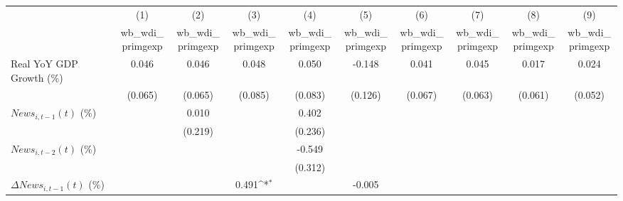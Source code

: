 {
\def\sym#1{\ifmmode^{#1}\else\(^{#1}\)\fi}
\begin{tabular}{l*{9}{c}}
\toprule
                    &\multicolumn{1}{c}{(1)}&\multicolumn{1}{c}{(2)}&\multicolumn{1}{c}{(3)}&\multicolumn{1}{c}{(4)}&\multicolumn{1}{c}{(5)}&\multicolumn{1}{c}{(6)}&\multicolumn{1}{c}{(7)}&\multicolumn{1}{c}{(8)}&\multicolumn{1}{c}{(9)}\\
                    &\multicolumn{1}{c}{wb_wdi_primgexp}&\multicolumn{1}{c}{wb_wdi_primgexp}&\multicolumn{1}{c}{wb_wdi_primgexp}&\multicolumn{1}{c}{wb_wdi_primgexp}&\multicolumn{1}{c}{wb_wdi_primgexp}&\multicolumn{1}{c}{wb_wdi_primgexp}&\multicolumn{1}{c}{wb_wdi_primgexp}&\multicolumn{1}{c}{wb_wdi_primgexp}&\multicolumn{1}{c}{wb_wdi_primgexp}\\
\midrule
Real YoY GDP Growth (\%)&       0.046         &       0.046         &       0.048         &       0.050         &      -0.148         &       0.041         &       0.045         &       0.017         &       0.024         \\
                    &     (0.065)         &     (0.065)         &     (0.085)         &     (0.083)         &     (0.126)         &     (0.067)         &     (0.063)         &     (0.061)         &     (0.052)         \\
\addlinespace
$ News_{i,t-1}(t)$ (\%)&                     &       0.010         &                     &       0.402         &                     &                     &                     &                     &                     \\
                    &                     &     (0.219)         &                     &     (0.236)         &                     &                     &                     &                     &                     \\
\addlinespace
$ News_{i,t-2}(t)$ (\%)&                     &                     &                     &      -0.549         &                     &                     &                     &                     &                     \\
                    &                     &                     &                     &     (0.312)         &                     &                     &                     &                     &                     \\
\addlinespace
$ \Delta News_{i,t-1}(t)$ (\%)&                     &                     &       0.491\sym{*}  &                     &      -0.005         &                     &                     &                     &                     \\

\end{tabular}}
